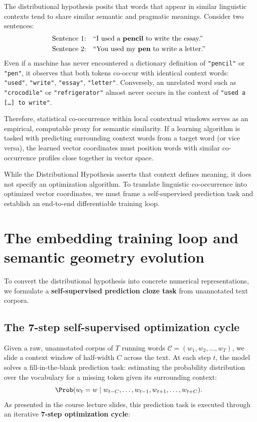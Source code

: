 \documentclass[../../main.tex]{subfiles}
\begin{document}
The distributional hypothesis posits that words that appear in similar linguistic contexts tend to share similar semantic and pragmatic meanings. Consider two sentences:
\begin{align*}
\text{Sentence 1:} \quad &\text{``I used a \textbf{pencil} to write the essay.''} \\
\text{Sentence 2:} \quad &\text{``You used my \textbf{pen} to write a letter.''}
\end{align*}
Even if a machine has never encountered a dictionary definition of \texttt{"pencil"} or \texttt{"pen"}, it observes that both tokens co-occur with identical context words: \texttt{"used"}, \texttt{"write"}, \texttt{"essay"}, \texttt{"letter"}. Conversely, an unrelated word such as \texttt{"crocodile"} or \texttt{"refrigerator"} almost never occurs in the context of \texttt{"used a [\dots] to write"}.

Therefore, statistical co-occurrence within local contextual windows serves as an empirical, computable proxy for semantic similarity. If a learning algorithm is tasked with predicting surrounding context words from a target word (or vice versa), the learned vector coordinates must position words with similar co-occurrence profiles close together in vector space.

While the Distributional Hypothesis asserts that context defines meaning, it does not specify an optimization algorithm. To translate linguistic co-occurrence into optimized vector coordinates, we must frame a self-supervised prediction task and establish an end-to-end differentiable training loop.

\section{The embedding training loop and semantic geometry evolution}
\label{sec:embedding_training_loop}

To convert the distributional hypothesis into concrete numerical representations, we formulate a \textbf{self-supervised prediction cloze task} from unannotated text corpora.

\subsection{The 7-step self-supervised optimization cycle}
\label{subsec:seven_step_loop}

Given a raw, unannotated corpus of $T$ running words $\mathcal{C} = (w_1, w_2, \dots, w_T)$, we slide a context window of half-width $C$ across the text. At each step $t$, the model solves a fill-in-the-blank prediction task: estimating the probability distribution over the vocabulary for a missing token given its surrounding context:
\begin{equation}
\label{eq:cloze_task}
\Prob(w_t = w \mid w_{t-C}, \dots, w_{t-1}, w_{t+1}, \dots, w_{t+C}).
\end{equation}
As presented in the course lecture slides, this prediction task is executed through an iterative \textbf{7-step optimization cycle}:
\end{document}
